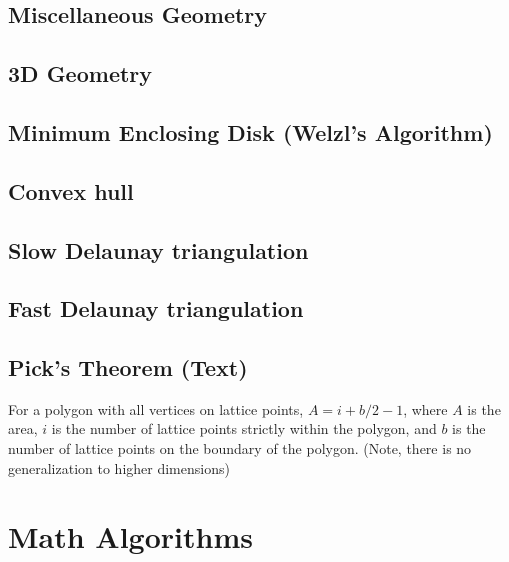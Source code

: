 \documentclass[9pt]{extarticle}
\begin{document}
\begin{multicols*}{3}
\subsection{Miscellaneous Geometry} %


\subsection{3D Geometry}


\subsection{Minimum Enclosing Disk (Welzl's Algorithm)} %


\subsection{Convex hull} %


\subsection{Slow Delaunay triangulation} %


\subsection{Fast Delaunay triangulation}


\subsection{Pick's Theorem (Text)} %
For a polygon with all vertices on lattice points, $A = i + b/2 - 1$, where $A$
is the area, $i$ is the number of lattice points strictly within the polygon,
and $b$ is the number of lattice points on the boundary of the polygon. (Note,
there is no generalization to higher dimensions)

\section{Math Algorithms}


\end{multicols*}
\end{document}
